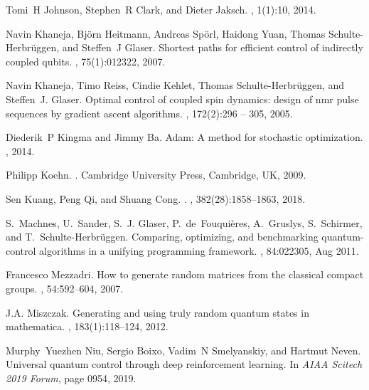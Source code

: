 \documentclass[aps,pra,showkeys,showpacs,notitlepage,superscriptaddress]{revtex4-1}
\newcommand{\1}{{\rm 1\hspace{-0.9mm}l}}
\begin{document}
\begin{thebibliography}{10}
  Tomi~H Johnson, Stephen~R Clark, and Dieter Jaksch.
  , 1(1):10, 2014.
  
  Navin Khaneja, Bj{\"o}rn Heitmann, Andreas Sp{\"o}rl, Haidong Yuan, Thomas
  Schulte-Herbr{\"u}ggen, and Steffen~J Glaser.
  \newblock Shortest paths for efficient control of indirectly coupled qubits.
  , 75(1):012322, 2007.
  
  Navin Khaneja, Timo Reiss, Cindie Kehlet, Thomas Schulte-Herbrüggen, and
  Steffen~J. Glaser.
  \newblock Optimal control of coupled spin dynamics: design of nmr pulse
  sequences by gradient ascent algorithms.
  , 172(2):296 -- 305, 2005.
  
  Diederik~P Kingma and Jimmy Ba.
  \newblock Adam: A method for stochastic optimization.
  , 2014.
  
  Philipp Koehn.
  .
  \newblock Cambridge University Press, Cambridge, UK, 2009.
  
  Sen Kuang, Peng Qi, and Shuang Cong.
  .
  , 382(28):1858--1863, 2018.
  
  S.~Machnes, U.~Sander, S.~J. Glaser, P.~de~Fouqui\`eres, A.~Gruslys,
  S.~Schirmer, and T.~Schulte-Herbr\"uggen.
  \newblock Comparing, optimizing, and benchmarking quantum-control algorithms in
  a unifying programming framework.
  , 84:022305, Aug 2011.
  
  Francesco Mezzadri.
  \newblock How to generate random matrices from the classical compact groups.
  , 54:592--604, 2007.
  
  J.A. Miszczak.
  \newblock Generating and using truly random quantum states in mathematica.
  , 183(1):118--124, 2012.
  
  Murphy~Yuezhen Niu, Sergio Boixo, Vadim~N Smelyanskiy, and Hartmut Neven.
  \newblock Universal quantum control through deep reinforcement learning.
  \newblock In {\em AIAA Scitech 2019 Forum}, page 0954, 2019.
  

\end{thebibliography}
\end{document}
